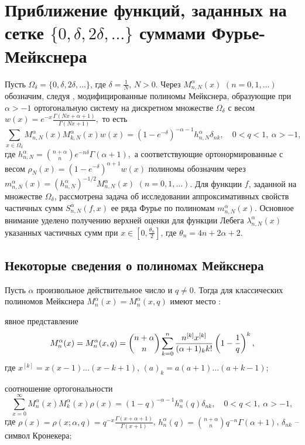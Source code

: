 \chapter{Приближение функций, заданных на сетке $\{0, \delta, 2\delta, \ldots\}$ суммами Фурье-Мейкснера}


Пусть $\Omega_{\delta}=\{0, \delta, 2\delta, \ldots\}$, где $\delta=\frac{1}{N}$, $N>0$.
Через $M_{n,N}^\alpha(x)$ $(n=0, 1, \dots)$ обозначим, следуя \cite{Ram1}, модифицированные полиномы Мейкснера, образующие при $\alpha>-1$ ортогональную систему на дискретном множестве $\Omega_{\delta}$ с весом
$w(x)=e^{-x}\frac{\Gamma(Nx+\alpha+1)}{\Gamma(Nx+1)},
$
то есть
$$
\sum_{x\in\Omega_{\delta}} M_{n,N}^\alpha(x)M_{k,N}^\alpha(x)w(x)=(1-e^{-\delta})^{-\alpha-1}h_{n,N}^\alpha\delta_{nk}, \quad 0<q<1,
\ \alpha>-1,
$$
где $h_{n,N}^\alpha={n+\alpha\choose n}e^{-n\delta}\Gamma(\alpha+1),$
а соответствующие ортонормированные с весом $\rho_N(x)=(1-e^{-\delta})^{\alpha+1}w(x)$ полиномы обозначим через $m_{n,N}^\alpha(x)=(h_{n,N}^\alpha)^{-1/2}M_{n,N}^\alpha(x)$ $(n=0, 1, \dots)$.
Для функции $f$, заданной на множестве $\Omega_{\delta}$, рассмотрена задача об исследовании аппроксимативных свойств частичных сумм $S_{n,N}^{\alpha}(f,x)$ ее ряда Фурье по полиномам $m_{n,N}^\alpha(x)$. Основное внимание уделено получению верхней оценки для функции Лебега $\lambda_{n,N}^{\alpha}(x)$ указанных частичных сумм при $x\in[0,\frac{\theta_n}{2}]$, где $\theta_n=4n+2\alpha+2$.



\section{Некоторые сведения о полиномах Мейкснера}

Пусть $\alpha$ произвольное действительное число и $q\ne0$. Тогда для классических полиномов Мейкснера $M_{n}^{\alpha}(x)=M_{n}^{\alpha}(x,q)$ имеют место \cite{Ram1, Ram2, Ram3}:

явное представление
\begin{equation*}
M_n^\alpha(x)=M_n^\alpha(x,q)={n+\alpha\choose n}\sum_{k=0}^n{n^{[k]}x^{[k]}\over(\alpha+1)_kk!}\left(1-{1\over q}\right)^k,
\end{equation*}
где $x^{[k]}=x(x-1)\ldots (x-k+1)$, $(a)_k=a(a+1)\ldots(a+k-1)$;

соотношение ортогональности
\begin{equation*}
\sum_{x=0}^\infty M_n^\alpha(x)M_k^\alpha(x)\rho(x)=(1-q)^{-\alpha-1}h_n^\alpha(q)\delta_{nk}, \quad 0<q<1,\ \alpha>-1,
\end{equation*}
где  $\rho(x)=\rho(x;\alpha,q)=q^{-x}\frac{\Gamma(x+\alpha+1)}{\Gamma(x+1)}$,
$h_n^\alpha(q)={n+\alpha\choose n}q^{-n}\Gamma(\alpha+1)$,
$\delta_{nk}$ -- символ Кронекера;

